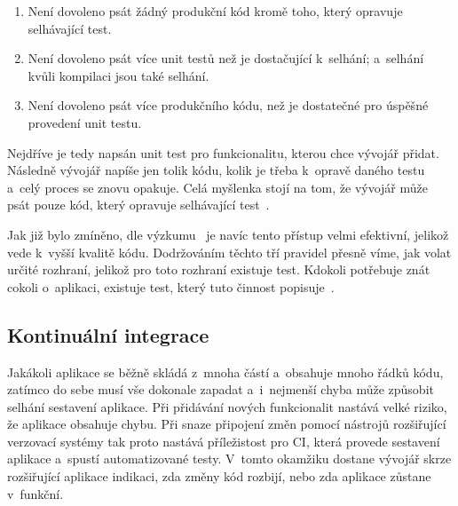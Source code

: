 \begin{enumerate}
    \item Není dovoleno psát žádný produkční kód kromě toho,
    který opravuje selhávající test.
    \item Není dovoleno psát více unit testů než je dostačující k~selhání;
    a~selhání kvůli kompilaci jsou také selhání.
    \item Není dovoleno psát více produkčního kódu,
    než je dostatečné pro úspěšné provedení unit testu.
\end{enumerate}

Nejdříve je tedy napsán unit test pro funkcionalitu,
kterou chce vývojář přidat.
Následně vývojář napíše jen tolik kódu,
kolik je třeba k~opravě daného testu a~celý proces se znovu opakuje.
Celá myšlenka stojí na tom,
že vývojář může psát pouze kód,
který opravuje selhávající test~\cite{tdd}.
\emph{}~\cite{tdd}
 
Jak již bylo zmíněno,
dle výzkumu~\cite{testing_quality} je navíc tento přístup velmi efektivní,
jelikož vede k~vyšší kvalitě kódu.
Dodržováním těchto tří pravidel přesně víme,
jak volat určité rozhraní,
jelikož pro toto rozhraní existuje test.
Kdokoli potřebuje znát cokoli o~aplikaci,
existuje test,
který tuto činnost popisuje~\cite{tdd}.

\subsection{Kontinuální integrace}
\label{chap:ci}

Jakákoli aplikace se běžně skládá z~mnoha částí
a~obsahuje mnoho řádků kódu,
zatímco do sebe musí vše dokonale zapadat
a~i~nejmenší chyba může způsobit selhání sestavení aplikace.
Při přidávání nových funkcionalit nastává velké riziko,
že aplikace obsahuje chybu.
Při snaze připojení změn pomocí nástrojů rozšiřující verzovací systémy
tak proto nastává příležistost pro CI,
která provede sestavení aplikace a~spustí automatizované testy.
V~tomto okamžiku dostane vývojář skrze rozšiřující aplikace indikaci,
zda změny kód rozbijí,
nebo zda aplikace zůstane v~funkční.~\cite{ci}

